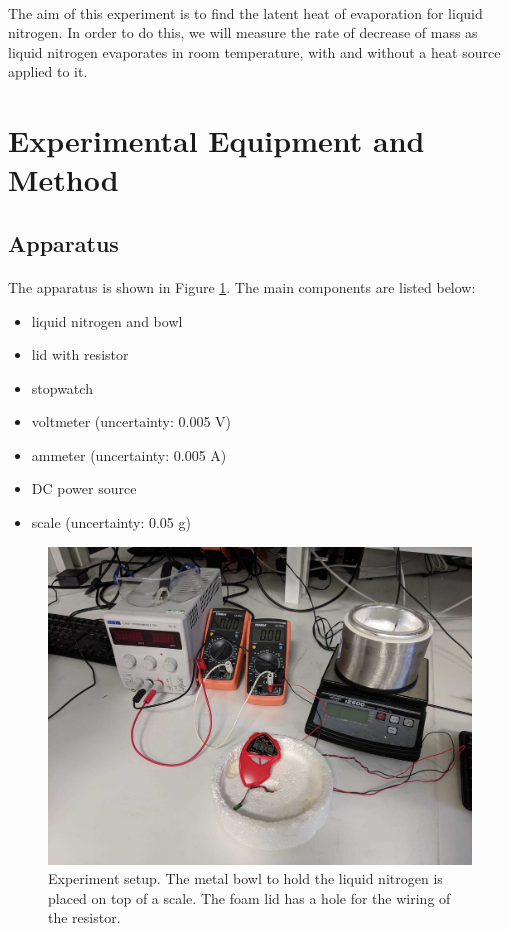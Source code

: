 \documentclass{article}
\begin{document}
\paragraph{}

The aim of this experiment is to find the latent heat of evaporation for liquid nitrogen. In order to do this, we will measure the rate of decrease of mass as liquid nitrogen evaporates in room temperature, with and without a heat source applied to it.

\section{Experimental Equipment and Method}
\subsection{Apparatus}
\paragraph{}
The apparatus is shown in Figure \ref{fig:apparatus}. The main components are listed below:

\begin{itemize}
  \item liquid nitrogen and bowl
  \item lid with resistor
  \item stopwatch
  \item voltmeter (uncertainty: 0.005 V)
  \item ammeter (uncertainty: 0.005 A)
  \item DC power source
  \item scale (uncertainty: 0.05 g)
\end{itemize}

\begin{figure}[H]
  \includegraphics[width=\textwidth]{./img/apparatus.pdf}
  \caption{Experiment setup. The metal bowl to hold the liquid nitrogen is placed on top of a scale. The foam lid has a hole for the wiring of the resistor.}
  \label{fig:apparatus}
\end{figure}
\end{document}
